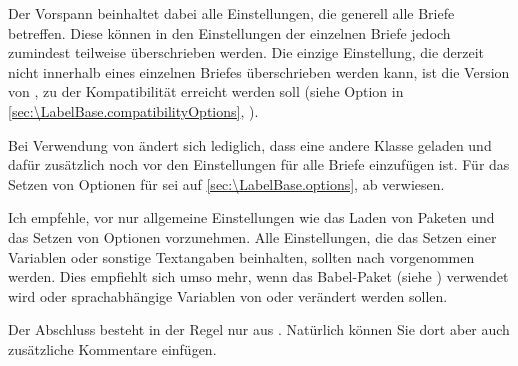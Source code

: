 Der Vorspann beinhaltet dabei alle Einstellungen, die generell alle Briefe
betreffen. Diese können in den Einstellungen der einzelnen Briefe jedoch
zumindest teilweise überschrieben werden. Die einzige Einstellung, die derzeit
nicht innerhalb eines einzelnen Briefes überschrieben werden kann, ist die
Version von , zu der Kompatibilität
erreicht werden soll (siehe Option  in
\autoref{sec:\LabelBase.compatibilityOptions},
).

Bei Verwendung von  ändert sich
lediglich, dass eine andere Klasse geladen und dafür zusätzlich
 noch vor den
Einstellungen für alle Briefe einzufügen ist. Für das Setzen von Optionen für
 sei auf \autoref{sec:\LabelBase.options}, ab
 verwiesen.

Ich empfehle, vor  nur allgemeine
Einstellungen wie das Laden von Paketen und das Setzen von Optionen
vorzunehmen. Alle Einstellungen, die das Setzen einer Variablen oder sonstige
Textangaben beinhalten, sollten nach 
vorgenommen werden. Dies empfiehlt sich umso mehr, wenn das
Babel-Paket (siehe \cite{package:babel}) verwendet wird
oder sprachabhängige Variablen von  oder 
verändert werden sollen.

Der Abschluss besteht in der Regel nur aus
. Natürlich können Sie dort aber auch
zusätzliche Kommentare einfügen.

